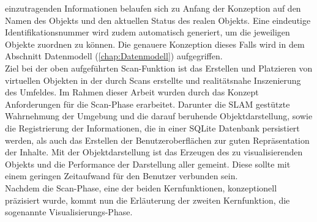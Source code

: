 einzutragenden Informationen belaufen sich zu Anfang der %
Konzeption auf den Namen des Objekts %
und den aktuellen Status des realen Objekts. Eine eindeutige Identifikationsnummer wird zudem automatisch generiert, 
um die jeweiligen Objekte zuordnen zu können. 
Die genauere Konzeption dieses Falls wird in dem Abschnitt Datenmodell (\ref{chap:Datenmodell}) aufgegriffen. 
\\ 
Ziel bei der oben aufgeführten Scan-Funktion ist das Erstellen und Platzieren von virtuellen Objekten in der durch Scans erstellte und 
realitätsnahe Inszenierung des Umfeldes. Im Rahmen dieser Arbeit wurden durch das Konzept Anforderungen für die Scan-Phase erarbeitet. 
Darunter die \acs{SLAM} gestützte Wahrnehmung der Umgebung und die darauf beruhende Objektdarstellung, sowie die Registrierung der Informationen, die in 
einer SQLite Datenbank persistiert werden, als auch das Erstellen der Benutzeroberflächen zur guten Repräsentation der Inhalte. Mit der Objektdarstellung 
ist das Erzeugen des zu visualisierenden Objekts und die Performance der Darstellung aller gemeint. Diese sollte mit einem geringen Zeitaufwand für den 
Benutzer verbunden sein.
\\ 
\linebreak
Nachdem die Scan-Phase, eine der beiden Kernfunktionen, konzeptionell präzisiert wurde, kommt nun die Erläuterung der zweiten Kernfunktion, 
die sogenannte Visualisierungs-Phase. 

